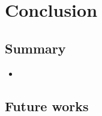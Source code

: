 \chapter{Conclusion}
\section{Summary}

\begin{itemize}
    \item
\end{itemize}

\section{Future works}